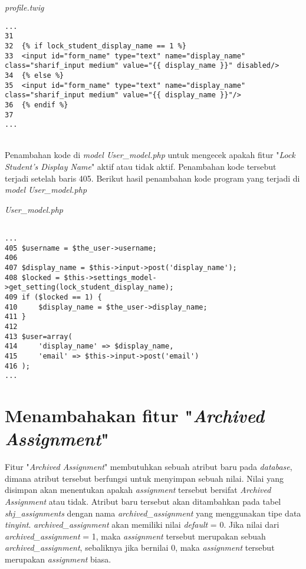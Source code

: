 \textit{profile.twig}
\begin{lstlisting}[basicstyle=\ttfamily, frame=single,
columns=fullflexible, keepspaces=true, breaklines=true]
...
31
32	{% if lock_student_display_name == 1 %}
33	<input id="form_name" type="text" name="display_name" class="sharif_input medium" value="{{ display_name }}" disabled/>
34	{% else %}
35	<input id="form_name" type="text" name="display_name" class="sharif_input medium" value="{{ display_name }}"/>
36	{% endif %}
37
...
\end{lstlisting}
~\\
Penambahan kode di \textit{model User\_model.php} untuk mengecek apakah fitur "\textit{Lock Student's Display Name}" aktif atau tidak aktif. Penambahan kode tersebut terjadi setelah baris 405. Berikut hasil penambahan kode program yang terjadi di \textit{model User\_model.php}

\textit{User\_model.php}
\begin{lstlisting}[basicstyle=\ttfamily, frame=single,
columns=fullflexible, keepspaces=true, breaklines=true]

...
405	$username = $the_user->username;
406
407	$display_name = $this->input->post('display_name');
408	$locked = $this->settings_model->get_setting(lock_student_display_name);
409	if ($locked == 1) {
410		$display_name = $the_user->display_name;
411	}
412	
413	$user=array(
414		'display_name' => $display_name,
415		'email' => $this->input->post('email')
416	);
...
\end{lstlisting}

\section{Menambahakan fitur "\textit{Archived Assignment}"}
Fitur "\textit{Archived Assignment}" membutuhkan sebuah atribut baru pada \textit{database}, dimana atribut tersebut berfungsi untuk menyimpan sebuah nilai. Nilai yang disimpan akan menentukan apakah \textit{assignment} tersebut bersifat \textit{Archived Assignment} atau tidak. Atribut baru tersebut akan ditambahkan pada tabel \textit{shj\_assignments} dengan nama \textit{archived\_assignment} yang menggunakan tipe data \textit{tinyint}. \textit{archived\_assignment} akan memiliki nilai \textit{default} = 0. Jika nilai dari \textit{archived\_assignment} = 1, maka \textit{assignment} tersebut merupakan sebuah \textit{archived\_assignment}, sebaliknya jika bernilai 0, maka \textit{assignment} tersebut merupakan \textit{assignment} biasa.

